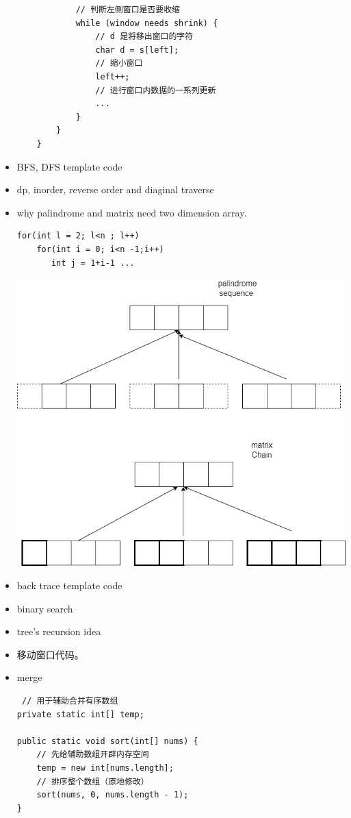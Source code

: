 \documentclass[a4paper,11pt,twoside]{book}
\begin{document}
\begin{itemize}
\begin{lstlisting}
			// 判断左侧窗口是否要收缩
			while (window needs shrink) {
				// d 是将移出窗口的字符
				char d = s[left];
				// 缩小窗口
				left++;
				// 进行窗口内数据的一系列更新
				...
			}
		}
	}
\end{lstlisting}
	
	\item BFS, DFS template code
	\item dp, inorder, reverse order and diaginal traverse
	
	\item why palindrome and matrix need two dimension array. 
\begin{lstlisting}
for(int l = 2; l<n ; l++)
	for(int i = 0; i<n -1;i++)
	   int j = 1+i-1 ...
\end{lstlisting}
	
	\includegraphics[scale=0.25]{pics/dp.drawio.png}
	
	\item back trace template code
	\item binary search 
	\item tree's recursion idea
	\item 移动窗口代码。
	
	\item merge
\begin{lstlisting}
 // 用于辅助合并有序数组
private static int[] temp;

public static void sort(int[] nums) {
	// 先给辅助数组开辟内存空间
	temp = new int[nums.length];
	// 排序整个数组（原地修改）
	sort(nums, 0, nums.length - 1);
}


\end{lstlisting}
\end{itemize}
\end{document}
